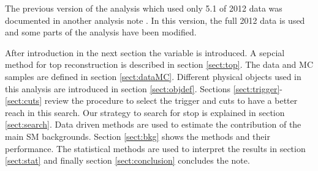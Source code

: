 The previous version of the analysis which used only 5.1 \invfb of 2012 data was documented in another analysis note \cite{AN5Invfb}. 
In this version, the full 2012 data is used and some parts of the analysis have been modified.

After introduction in the next section the \mttwo variable is introduced. 
A sepcial method for top reconstruction is described in section \ref{sect:top}.
The data and MC samples are defined in section \ref{sect:dataMC}. 
Different physical objects used in this analysis are introduced in section \ref{sect:objdef}. 
Sections \ref{sect:trigger}-\ref{sect:cuts} review the procedure to 
select the trigger and cuts to have a better reach in this search.
Our strategy to search for stop is explained in section \ref{sect:search}.
Data driven methods are used to estimate the contribution of the main SM backgrounds. 
Section \ref{sect:bkg} shows the methods and their performance.
The statistical methods are used to interpret the results in section \ref{sect:stat} and finally section \ref{sect:conclusion} concludes the note.



